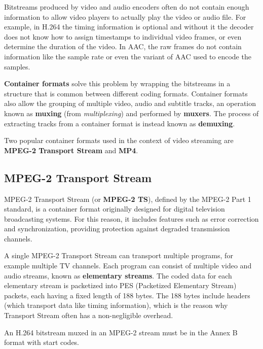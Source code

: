 Bitstreams produced by video and audio encoders often do not contain enough information to allow video players to actually play the video or audio file. For example, in H.264 the timing information is optional and without it the decoder does not know how to assign timestamps to individual video frames, or even determine the duration of the video.\cite{h264itu} In AAC, the raw frames do not contain information like the sample rate or even the variant of AAC used to encode the samples.\cite{aac}

\textbf{Container formats} solve this problem by wrapping the bitstreams in a structure that is common between different coding formats. Container formats also allow the grouping of multiple video, audio and subtitle tracks, an operation known as \textbf{muxing} (from \textit{multiplexing}) and performed by \textbf{muxers}. The process of extracting tracks from a container format is instead known as \textbf{demuxing}.

Two popular container formats used in the context of video streaming are \textbf{MPEG-2 Transport Stream} and \textbf{MP4}.

\subsection{MPEG-2 Transport Stream}
\label{sec:bg/containers/mpeg2ts}

MPEG-2 Transport Stream (or \textbf{MPEG-2 TS}), defined by the MPEG-2 Part 1 standard, is a container format originally designed for digital television broadcasting systems. For this reason, it includes features such as error correction and synchronization, providing protection against degraded transmission channels.

A single MPEG-2 Transport Stream can transport multiple programs, for example multiple TV channels. Each program can consist of multiple video and audio streams, known as \textbf{elementary streams}. The coded data for each elementary stream is packetized into PES (Packetized Elementary Stream) packets, each having a fixed length of 188 bytes. The 188 bytes include headers (which transport data like timing information), which is the reason why Transport Stream often has a non-negligible overhead.\cite{mpeg2ts}


An H.264 bitstream muxed in an MPEG-2 stream must be in the Annex B format with start codes.

